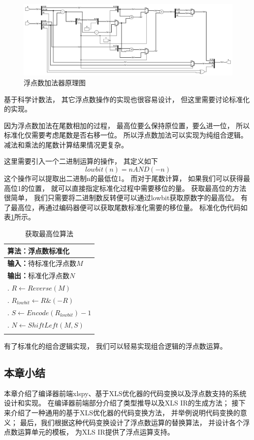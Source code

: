 \begin{figure}[h]
\centering
\includegraphics[width=\linewidth]{figure/float_add.png}
\caption{浮点数加法器原理图}
\label{fig:float_add}
\end{figure}

基于科学计数法，
其它浮点数操作的实现也很容易设计，
但这里需要讨论标准化的实现。

因为浮点数加法在尾数相加的过程，
最高位要么保持原位置，要么进一位，
所以标准化仅需要考虑尾数是否右移一位。
所以浮点数加法可以实现为纯组合逻辑。
减法和乘法的尾数计算结果情况更复杂。

这里需要引入一个二进制运算的操作，
其定义如下
$$lowbit(n) = n AND (-n)$$
这个操作可以提取出二进制n的最低位1。
而对于尾数计算，
如果我们可以获得最高位1的位置，
就可以直接指定标准化过程中需要移位的量。
获取最高位的方法很简单，
我们只需要将二进制数反转便可以通过lowbit获取原数字的最高位。
有了最高位，再通过编码器便可以获取尾数标准化需要的移位量。
标准化伪代码如表\ref{alg.normalize}所示。

\begin{table}
\begin{flushleft}
    \caption{获取最高位算法}
    \label{alg.normalize}
    \begin{tabular*}{\hsize}{@{}@{\extracolsep{\fill}}l@{}}
        \Xhline{3\arrayrulewidth}
        \;\textbf{算法：}浮点数标准化 \\
        \hline

        \;\textbf{输入：}$\text{待标准化浮点数}M$ \\
        \;\textbf{输出：}$\text{标准化浮点数}N$ \\
        \;1. $R \gets Reverse(M)$ \\
        \;2. $R_{lowbit} \gets R \& (-R)$ \\
        \;3. $S \gets Encode(R_{lowbit}) - 1$ \\
        \;4. $N \gets ShiftLeft(M, S)$ \\

        \Xhline{3\arrayrulewidth}
    \end{tabular*}
\end{flushleft}
\end{table}

有了标准化的组合逻辑实现，
我们可以轻易实现组合逻辑的浮点数运算。

\subsection{本章小结}

本章介绍了编译器前端xlspy、基于XLS优化器的代码变换以及浮点数支持的系统设计和实现。
在编译器前端部分介绍了类型推导以及XLS IR的生成方法；
接下来介绍了一种通用的基于XLS优化器的代码变换方法，
并举例说明代码变换的意义；
最后，我们根据这种代码变换设计了浮点数运算的替换算法，
并设计各个浮点数运算单元的模板，
为XLS IR提供了浮点运算支持。